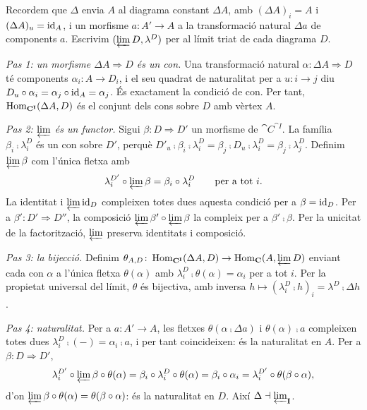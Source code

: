\begin{prova}
Recordem que $\Delta$ envia $A$ al diagrama constant $\Delta A$, amb $(\Delta A)_i=A$ i $(\Delta A)_u=\operatorname{id}_A$, i un morfisme $a\colon A'\to A$ a la transformació natural $\Delta a$ de components $a$. Escrivim $(\varprojlim D,\lambda^D)$ per al límit triat de cada diagrama $D$.

\emph{Pas 1: un morfisme $\Delta A\Rightarrow D$ és un con.} Una transformació natural $\alpha\colon\Delta A\Rightarrow D$ té components $\alpha_i\colon A\to D_i$, i el seu quadrat de naturalitat per a $u\colon i\to j$ diu $D_u\circ\alpha_i=\alpha_j\circ\operatorname{id}_A=\alpha_j$. És exactament la condició de con. Per tant, $\operatorname{Hom}_{\mathbf{C}^{\mathbf{I}}}(\Delta A,D)$ és el conjunt dels cons sobre $D$ amb vèrtex $A$.

\emph{Pas 2: $\varprojlim$ és un functor.} Sigui $\beta\colon D\Rightarrow D'$ un morfisme de $\cat{C}^{\cat{I}}$. La família $\beta_i\comp\lambda^D_i$ és un con sobre $D'$, perquè $D'_u\comp\beta_i\comp\lambda^D_i=\beta_j\comp D_u\comp\lambda^D_i=\beta_j\comp\lambda^D_j$. Definim $\varprojlim\beta$ com l'única fletxa amb
\[
\lambda^{D'}_i\circ\varprojlim\beta=\beta_i\circ\lambda^D_i\qquad\text{per a tot } i.
\]
La identitat i $\varprojlim\operatorname{id}_D$ compleixen totes dues aquesta condició per a $\beta=\operatorname{id}_D$. Per a $\beta'\colon D'\Rightarrow D''$, la composició $\varprojlim\beta'\circ\varprojlim\beta$ la compleix per a $\beta'\comp\beta$. Per la unicitat de la factorització, $\varprojlim$ preserva identitats i composició.

\emph{Pas 3: la bijecció.} Definim $\theta_{A,D}\colon\operatorname{Hom}_{\mathbf{C}^{\mathbf{I}}}(\Delta A,D)\to\operatorname{Hom}_{\mathbf{C}}(A,\varprojlim D)$ enviant cada con $\alpha$ a l'única fletxa $\theta(\alpha)$ amb $\lambda^D_i\comp\theta(\alpha)=\alpha_i$ per a tot $i$. Per la propietat universal del límit, $\theta$ és bijectiva, amb inversa $h\mapsto(\lambda^D_i\comp h)_i=\lambda^D\comp\Delta h$.

\emph{Pas 4: naturalitat.} Per a $a\colon A'\to A$, les fletxes $\theta(\alpha\comp\Delta a)$ i $\theta(\alpha)\comp a$ compleixen totes dues $\lambda^D_i\comp(-)=\alpha_i\comp a$, i per tant coincideixen: és la naturalitat en $A$. Per a $\beta\colon D\Rightarrow D'$,
\[
\lambda^{D'}_i\circ\varprojlim\beta\circ\theta(\alpha)=\beta_i\circ\lambda^D_i\circ\theta(\alpha)=\beta_i\circ\alpha_i=\lambda^{D'}_i\circ\theta(\beta\circ\alpha),
\]
d'on $\varprojlim\beta\circ\theta(\alpha)=\theta(\beta\circ\alpha)$: és la naturalitat en $D$. Així $\Delta\dashv\varprojlim_{\mathbf{I}}$.


\end{prova}
